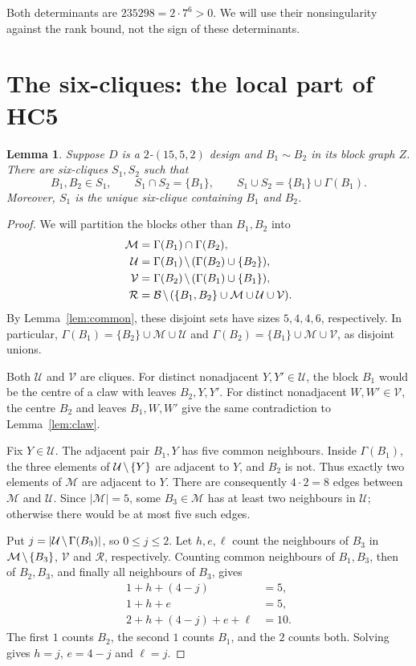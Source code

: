 \documentclass[11pt]{article}
\newcommand\cB{{\mathcal B}}
\newcommand\cM{{\mathcal M}}
\newcommand\cR{{\mathcal R}}
\newcommand\cU{{\mathcal U}}
\newcommand\cV{{\mathcal V}}
\newcommand\diff{\mathbin{\mkern-1.5mu\setminus\mkern-1.5mu}}%
\newtheorem{lemma}[theorem]{Lemma}
\theoremstyle{definition}
\begin{document}
Both determinants are $235298=2\cdot7^6>0$. We will use their
nonsingularity against the rank bound, not the sign of these
determinants.

\section{The six-cliques: the local part of HC5}

\begin{lemma}\label{lem:local-split}
Suppose $D$ is a $2$-$(15,5,2)$ design and $B_1\sim B_2$ in its block
graph $Z$. There are six-cliques $S_1,S_2$ such that
\[
 B_1,B_2\in S_1,\qquad
 S_1\cap S_2=\{B_1\},\qquad
 S_1\cup S_2=\{B_1\}\cup\Gamma(B_1).
\]
Moreover, $S_1$ is the unique six-clique containing $B_1$ and $B_2$.
\end{lemma}
\begin{proof}
We will partition the blocks other than $B_1,B_2$ into
\[
\begin{aligned}
 \cM&=\Gamma(B_1)\cap\Gamma(B_2),\\
 \cU&=\Gamma(B_1)\diff(\Gamma(B_2)\cup\{B_2\}),\\
 \cV&=\Gamma(B_2)\diff(\Gamma(B_1)\cup\{B_1\}),\\
 \cR&=\cB\diff(\{B_1,B_2\}\cup\cM\cup\cU\cup\cV).
\end{aligned}
\]
By Lemma~\ref{lem:common}, these disjoint sets have sizes $5,4,4,6$,
respectively. In particular,
$\Gamma(B_1)=\{B_2\}\cup\cM\cup\cU$ and
$\Gamma(B_2)=\{B_1\}\cup\cM\cup\cV$, as disjoint unions.

Both $\cU$ and $\cV$ are cliques. For distinct nonadjacent $Y,Y'\in\cU$,
the block $B_1$ would be the centre of a claw with leaves $B_2,Y,Y'$.
For distinct nonadjacent $W,W'\in\cV$, the centre $B_2$ and leaves
$B_1,W,W'$ give the same contradiction to Lemma~\ref{lem:claw}.

Fix $Y\in\cU$. The adjacent pair $B_1,Y$ has five common neighbours.
Inside $\Gamma(B_1)$, the three elements of $\cU\diff\{Y\}$ are
adjacent to $Y$, and $B_2$ is not. Thus exactly two elements of $\cM$
are adjacent to $Y$. There are consequently $4\cdot2=8$ edges between
$\cM$ and $\cU$. Since $|\cM|=5$, some $B_3\in\cM$ has at least
two neighbours in $\cU$; otherwise there would be at most five such
edges.

Put $j=|\cU\diff\Gamma(B_3)|$, so $0\le j\le2$. Let $h,e,\ell$ count
the neighbours of $B_3$ in $\cM\diff\{B_3\}$, $\cV$ and $\cR$,
respectively. Counting common neighbours of $B_1,B_3$, then of
$B_2,B_3$, and finally all neighbours of $B_3$, gives
\[
\begin{aligned}
 1+h+(4-j)&=5,\\
 1+h+e&=5,\\
 2+h+(4-j)+e+\ell&=10.
\end{aligned}
\]
The first $1$ counts $B_2$, the second $1$ counts $B_1$, and the $2$
counts both. Solving gives $h=j$, $e=4-j$ and $\ell=j$.


\end{proof}
\end{document}
